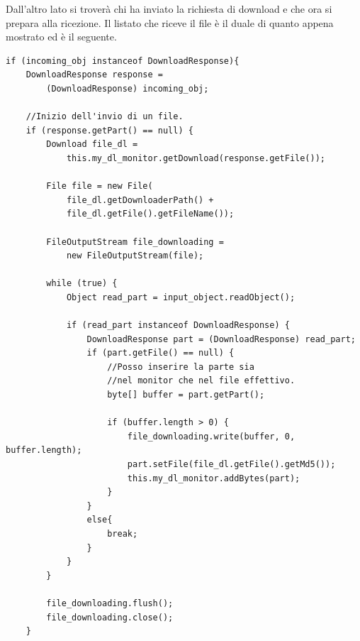 Dall'altro lato si troverà chi ha inviato la richiesta di download e che ora si prepara alla ricezione.
Il listato che riceve il file è il duale di quanto appena mostrato ed è il seguente.
\begin{lstlisting}
if (incoming_obj instanceof DownloadResponse){
	DownloadResponse response = 
		(DownloadResponse) incoming_obj;

	//Inizio dell'invio di un file.
	if (response.getPart() == null) {
		Download file_dl = 
			this.my_dl_monitor.getDownload(response.getFile());
		
		File file = new File(
			file_dl.getDownloaderPath() + 
			file_dl.getFile().getFileName());
		
		FileOutputStream file_downloading = 
			new FileOutputStream(file);
		
		while (true) {
			Object read_part = input_object.readObject();

			if (read_part instanceof DownloadResponse) {
				DownloadResponse part = (DownloadResponse) read_part;
				if (part.getFile() == null) {
					//Posso inserire la parte sia 
					//nel monitor che nel file effettivo.
					byte[] buffer = part.getPart();

					if (buffer.length > 0) {
						file_downloading.write(buffer, 0, buffer.length);
						part.setFile(file_dl.getFile().getMd5());
						this.my_dl_monitor.addBytes(part);
					}
				}
				else{
					break;
				}
			}
		}

		file_downloading.flush();
		file_downloading.close();
	}
\end{lstlisting}

